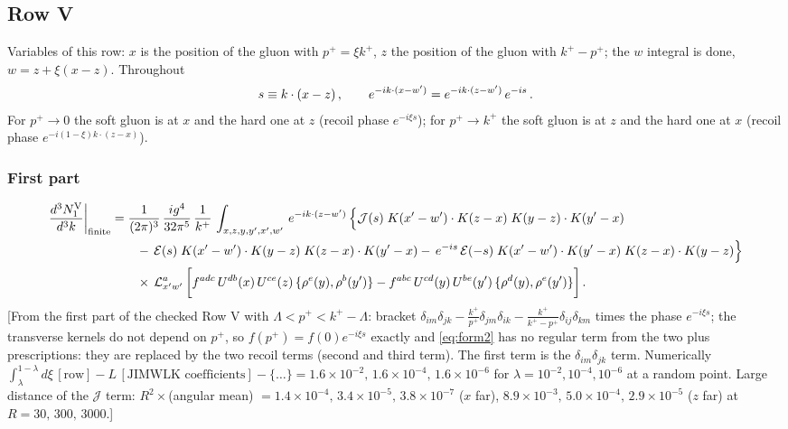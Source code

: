 \documentclass[9pt]{article}
\numberwithin{equation}{section}
\begin{document}
\subsection{Row V}
\noindent Variables of this row: $x$ is the position of the gluon with $p^{+}=\xi k^{+}$, $z$ the position of the gluon with $k^{+}-p^{+}$; the $w$ integral is done, $w=z+\xi(x-z)$. Throughout
\begin{align}
s\equiv k\cdot(x-z)\,,\qquad e^{-ik\cdot(x-w')}=e^{-ik\cdot(z-w')}\,e^{-is}\,.\notag
\end{align}
For $p^{+}\to0$ the soft gluon is at $x$ and the hard one at $z$ (recoil phase $e^{-i\xi s}$); for $p^{+}\to k^{+}$ the soft gluon is at $z$ and the hard one at $x$ (recoil phase $e^{-i(1-\xi)k\cdot(z-x)}$).
\subsubsection*{First part}
\begin{align}
\frac{d^{3}N_{1}^{\rm V}}{d^{3}k}\bigg|_{\rm finite}  & =  \frac{1}{(2\pi)^{3}}\, \frac{ig^{4}}{32\pi^{5}}\, \frac{1}{k^{+}}\,\int_{x,z,y,y',x',w'}\,e^{-ik\cdot (z-w^\prime)}\,\Big\{\mathcal{J}(s)\;K(x'-w')\cdot K(z-x)\;K(y-z)\cdot K(y'-x)\notag \\
&\qquad-\,\mathcal{E}(s)\;K(x'-w')\cdot K(y-z)\;K(z-x)\cdot K(y'-x)
-\,e^{-is}\,\mathcal{E}(-s)\;K(x'-w')\cdot K(y'-x)\;K(z-x)\cdot K(y-z)\Big\}\notag \\
&\qquad\times\,\mathcal{L}^{a}_{x'w'}\, \bigg[f^{adc}\,U^{db}(x)\,U^{ce}(z)\, \{\rho^{e}(y),\rho^{b}(y')\}-f^{abc}\,U^{cd}(y)\,U^{be}(y')\, \{\rho^{d}(y),\rho^{e}(y')\}\bigg]\,.\label{eq:V1}
\end{align}
{\color{gray}\small [From the first part of the checked Row V with $\Lambda<p^{+}<k^{+}-\Lambda$: bracket $\delta_{im}\delta_{jk}-\frac{k^{+}}{p^{+}}\delta_{jm}\delta_{ik}-\frac{k^{+}}{k^{+}-p^{+}}\delta_{ij}\delta_{km}$ times the phase $e^{-i\xi s}$; the transverse kernels do not depend on $p^{+}$, so $f(p^{+})=f(0)e^{-i\xi s}$ exactly and \eqref{eq:form2} has no regular term from the two plus prescriptions: they are replaced by the two recoil terms (second and third term). The first term is the $\delta_{im}\delta_{jk}$ term. Numerically $\int_{\lambda}^{1-\lambda}d\xi\,[\text{row}]-L\,[\text{JIMWLK coefficients}]-\{\dots\}=1.6\times10^{-2},\,1.6\times10^{-4},\,1.6\times10^{-6}$ for $\lambda=10^{-2},10^{-4},10^{-6}$ at a random point. Large distance of the $\mathcal{J}$ term: $R^{2}\times$(angular mean) $=1.4\times10^{-4},\,3.4\times10^{-5},\,3.8\times10^{-7}$ ($x$ far), $8.9\times10^{-3},\,5.0\times10^{-4},\,2.9\times10^{-5}$ ($z$ far) at $R=30,\,300,\,3000$.]}
\end{document}
